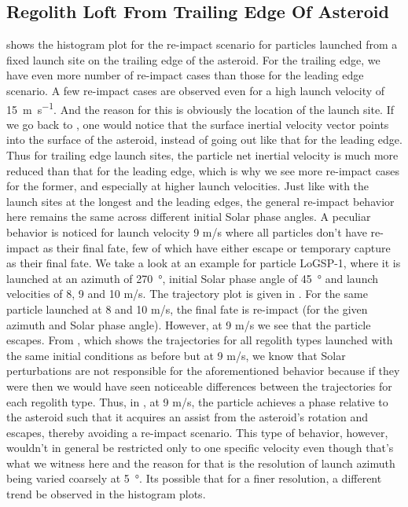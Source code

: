 \subsection{Regolith Loft From Trailing Edge Of Asteroid}
\label{sec:general_char_trailingEdge}
 shows the histogram plot for the re-impact scenario for particles launched from a fixed launch site on the trailing edge of the asteroid. For the trailing edge, we have even more number of re-impact cases than those for the leading edge scenario. A few re-impact cases are observed even for a high launch velocity of \SI{15}{\metre\per\second}. And the reason for this is obviously the location of the launch site. If we go back to , one would notice that the surface inertial velocity vector points into the surface of the asteroid, instead of going out like that for the leading edge. Thus for trailing edge launch sites, the particle net inertial velocity is much more reduced than that for the leading edge, which is why we see more re-impact cases for the former, and especially at higher launch velocities. Just like with the launch sites at the longest and the leading edges, the general re-impact behavior here remains the same across different initial Solar phase angles.
%
\newline\newline
%
A peculiar behavior is noticed for launch velocity 9 m/s where all particles don't have re-impact as their final fate, few of which have either escape or temporary capture as their final fate. We take a look at an example for particle LoGSP-1, where it is launched at an azimuth of \SI{270}{\degree}, initial Solar phase angle of \SI{45}{\degree} and launch velocities of 8, 9 and 10 m/s. The trajectory plot is given in . For the same particle launched at 8 and 10 m/s, the final fate is re-impact (for the given azimuth and Solar phase angle). However, at 9 m/s we see that the particle escapes. From , which shows the trajectories for all regolith types launched with the same initial conditions as before but at 9 m/s, we know that Solar perturbations are not responsible for the aforementioned behavior because if they were then we would have seen noticeable differences between the trajectories for each regolith type. Thus, in , at 9 m/s, the particle achieves a phase relative to the asteroid such that it acquires an assist from the asteroid's rotation and escapes, thereby avoiding a re-impact scenario. This type of behavior, however, wouldn't in general be restricted only to one specific velocity even though that's what we witness here and the reason for that is the resolution of launch azimuth being varied coarsely at \SI{5}{\degree}. Its possible that for a finer resolution, a different trend be observed in the histogram plots.
